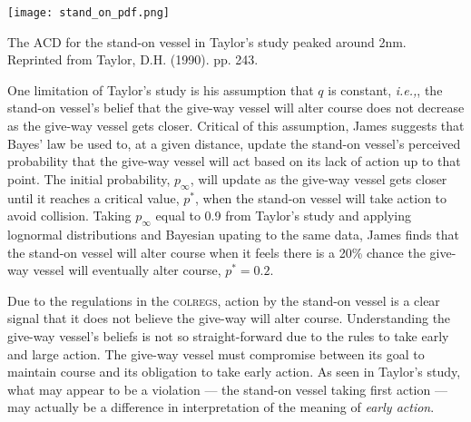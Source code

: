 \documentclass[twoside,symmetric,notoc]{tufte-book}
\newcommand{\hairsp}{\hspace{1pt}}
\newcommand{\ie}{\textit{i.\hairsp{}e.,}\hspace{3pt}}
\begin{document}
\begin{marginfigure}
\centering
	\texttt{[image: stand\_on\_pdf.png]}
	\caption[The ACD for the stand-on vessel in Taylor's study peaked around 2nm.]{The ACD for the stand-on vessel in Taylor's study peaked around 2nm. Reprinted from Taylor, D.H. (1990). pp. 243.}
	\label{fig:taylorSO}
	\forcerectofloat
\end{marginfigure}
\par{%
One limitation of Taylor's study is his assumption that $q$ is constant, \ie, the stand-on vessel's belief that the give-way vessel will alter course does not decrease as the give-way vessel gets closer. Critical of this assumption, James\cite{James} suggests that Bayes' law be used to, at a given distance, update the stand-on vessel's perceived probability that the give-way vessel will act based on its lack of action up to that point. The initial probability, $p_{\infty}$, will update as the give-way vessel gets closer until it reaches a critical value, $p^*$, when the stand-on vessel will take action to avoid collision. Taking $p_{\infty}$ equal to 0.9 from Taylor's study and applying lognormal distributions and Bayesian upating to the same data, James finds that the stand-on vessel will alter course when it feels there is a 20\% chance the give-way vessel will eventually alter course, $p^*=0.2$. 
}
\par{%
Due to the regulations in the \textsc{colregs}, action by the stand-on vessel is a clear signal that it does not believe the give-way will alter course. Understanding the give-way vessel's beliefs is not so straight-forward due to the rules to take early and large action. The give-way vessel must compromise between its goal to maintain course and its obligation to take early action. As seen in Taylor's study, what may appear to be a violation --- the stand-on vessel taking first action --- may actually be a difference in interpretation of the meaning of \textit{early action}.  
}
\end{document}
